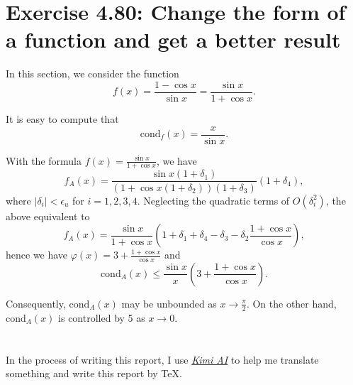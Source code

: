 \documentclass[a4paper]{article}
\begin{document}
\section{Exercise 4.80: Change the form of a function and get a better result}

In this section, we consider the function 
\begin{equation}
    f(x) = \frac{1 - \cos x}{\sin x} = \frac{\sin x}{1 + \cos x}.
    \label{eq:16_f}
\end{equation}

It is easy to compute that 
\begin{equation}
    \text{cond}_f (x) = \frac{x}{\sin x}.
    \label{eq:16_cond_f}
\end{equation}

With the formula $f(x) = \frac{\sin x}{1 + \cos x}$, we have 
\begin{equation}
    f_A(x) = \frac{\sin x(1 + \delta_1)}{(1 + \cos x(1 + \delta_2))(1 + \delta_3)}(1 + \delta_4),
    \label{eq:16_fA}
\end{equation}
where $|\delta_i| < \epsilon_u$ for $i = 1, 2, 3, 4$. Neglecting the quadratic terms of $O(\delta_i^2)$, the above equivalent to
\begin{equation}
    f_A(x) = \frac{\sin x}{1 + \cos x}(1 + \delta_1 + \delta_4 - \delta_3 - \delta_2 \frac{1 + \cos x}{\cos x}),
    \label{eq:16_fA_simplified}
\end{equation}
hence we have $\varphi(x) = 3 + \frac{1 + \cos x}{\cos x}$ and 
\begin{equation}
    \text{cond}_A (x) \leqslant \frac{\sin x}{x} \left(3 + \frac{1 + \cos x}{\cos x}\right).
    \label{eq:16_cond_A}
\end{equation}

Consequently, $\text{cond}_A(x)$ may be unbounded as $x \to \frac{\pi}{2}$. On the other hand, $\text{cond}_A (x)$ is controlled by 5 as $x \to 0$. 

\section*{  }

In the process of writing this report, I use \href{https://kimi.moonshot.cn/}{\textit{Kimi AI}} to help me translate something and write this report by \TeX.
\end{document}
